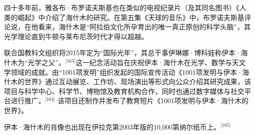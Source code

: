 四十多年前，雅各布·布罗诺夫斯基也在类似的电视纪录片（及其同名图书）《人类的崛起》中介绍了海什木的研究。在第五集《天球的音乐》中，布罗诺夫斯基评论说，在他看来，海什木是“阿拉伯文化所孕育出的唯一真正原创的科学头脑”，其光学理论直到牛顿与莱布尼茨时代才得以超越。

联合国教科文组织将2015年定为“国际光年”，其总干事伊琳娜·博科娃称伊本·海什木为“光学之父”。\(^\text{[163]}\)这一纪念活动旨在庆祝伊本·海什木在光学、数学与天文学领域的成就。由“1001项发明”组织发起的国际宣传活动《1001项发明与伊本·海什木的世界》通过互动展览、工作坊、现场演出等形式向公众介绍其研究成果，该项目与科学中心、科学节、博物馆及教育机构合作，同时也通过数字媒体与社交平台进行推广。\(^\text{[164]}\) 该项目还制作并发布了教育短片《1001项发明与伊本·海什木的世界》。

伊本·海什木的肖像也出现在伊拉克第2003年版的10,000第纳尔纸币上。\(^\text{[165]}\)
